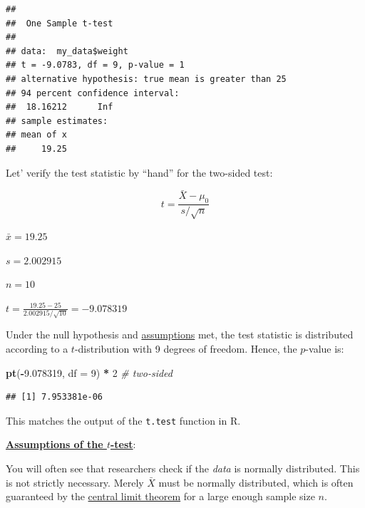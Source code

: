\documentclass[
]{book}
\newenvironment{Shaded}{\begin{snugshade}}{\end{snugshade}}
\newcommand{\AttributeTok}[1]{\textcolor[rgb]{0.13,0.29,0.53}{#1}}
\newcommand{\CommentTok}[1]{\textcolor[rgb]{0.56,0.35,0.01}{\textit{#1}}}
\newcommand{\DecValTok}[1]{\textcolor[rgb]{0.00,0.00,0.81}{#1}}
\newcommand{\FloatTok}[1]{\textcolor[rgb]{0.00,0.00,0.81}{#1}}
\newcommand{\FunctionTok}[1]{\textcolor[rgb]{0.13,0.29,0.53}{\textbf{#1}}}
\newcommand{\NormalTok}[1]{#1}
\newcommand{\SpecialCharTok}[1]{\textcolor[rgb]{0.81,0.36,0.00}{\textbf{#1}}}
\newcommand{\StringTok}[1]{\textcolor[rgb]{0.31,0.60,0.02}{#1}}
\begin{document}
\begin{Shaded}
\end{Shaded}

\begin{verbatim}
## 
##  One Sample t-test
## 
## data:  my_data$weight
## t = -9.0783, df = 9, p-value = 1
## alternative hypothesis: true mean is greater than 25
## 94 percent confidence interval:
##  18.16212      Inf
## sample estimates:
## mean of x 
##     19.25
\end{verbatim}

Let' verify the test statistic by ``hand'' for the two-sided test:

\[t = \frac{\bar{X} - \mu_0}{s/\sqrt{n}}\]

\(\bar{x} = 19.25\)

\(s = 2.002915\)

\(n = 10\)

\(t = \frac{19.25 - 25}{2.002915/\sqrt{10}} = -9.078319\)

Under the null hypothesis and
\href{https://en.wikipedia.org/wiki/Student\%27s_t-test\#Assumptions}{assumptions} met,
the test statistic is distributed according
to a \(t\)-distribution with 9 degrees of freedom.
Hence, the \(p\)-value is:

\begin{Shaded}
\begin{Highlighting}[]
\FunctionTok{pt}\NormalTok{(}\SpecialCharTok{{-}}\FloatTok{9.078319}\NormalTok{, }\AttributeTok{df =} \DecValTok{9}\NormalTok{) }\SpecialCharTok{*} \DecValTok{2} \CommentTok{\# two{-}sided}
\end{Highlighting}
\end{Shaded}

\begin{verbatim}
## [1] 7.953381e-06
\end{verbatim}

This matches the output of the \texttt{t.test} function in R.

\textbf{\href{https://en.wikipedia.org/wiki/Student\%27s_t-test\#Assumptions}{Assumptions of the \(t\)-test}}:

You will often see that researchers check if the \emph{data} is normally distributed.
This is not strictly necessary. Merely \(\bar{X}\) must be normally distributed, which is
often guaranteed by the
\href{https://en.wikipedia.org/wiki/Central_limit_theorem}{central limit theorem} for a
large enough sample size \(n\).
\end{document}
